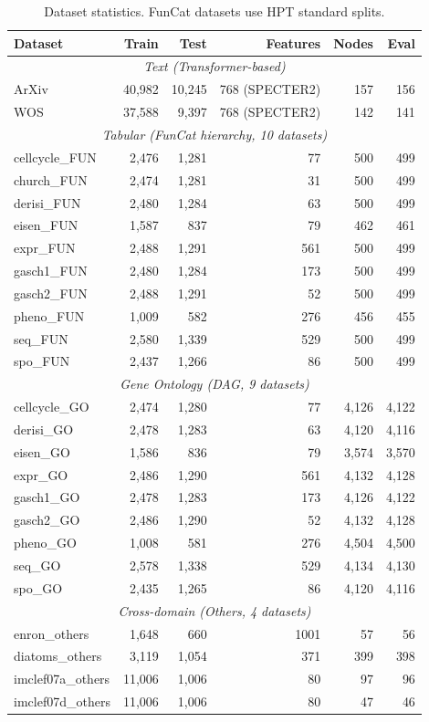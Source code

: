 \documentclass[11pt,a4paper]{article}
\begin{document}
\begin{table}[h]
\centering
\caption{Dataset statistics. FunCat datasets use HPT standard splits.}
\label{tab:datasets}
\begin{tabular}{lrrrrr}
\toprule
\textbf{Dataset} & \textbf{Train} & \textbf{Test} & \textbf{Features} &
\textbf{Nodes} & \textbf{Eval} \\
\midrule
\multicolumn{6}{c}{\textit{Text (Transformer-based)}} \\
ArXiv  & 40,982 & 10,245 & 768 (SPECTER2) & 157 & 156 \\
WOS    & 37,588 & 9,397  & 768 (SPECTER2) & 142 & 141 \\
\midrule
\multicolumn{6}{c}{\textit{Tabular (FunCat hierarchy, 10 datasets)}} \\
cellcycle\_FUN & 2,476 & 1,281 & 77  & 500 & 499 \\
church\_FUN    & 2,474 & 1,281 & 31  & 500 & 499 \\
derisi\_FUN    & 2,480 & 1,284 & 63  & 500 & 499 \\
eisen\_FUN     & 1,587 & 837   & 79  & 462 & 461 \\
expr\_FUN      & 2,488 & 1,291 & 561 & 500 & 499 \\
gasch1\_FUN    & 2,480 & 1,284 & 173 & 500 & 499 \\
gasch2\_FUN    & 2,488 & 1,291 & 52  & 500 & 499 \\
pheno\_FUN     & 1,009 & 582   & 276 & 456 & 455 \\
seq\_FUN       & 2,580 & 1,339 & 529 & 500 & 499 \\
spo\_FUN       & 2,437 & 1,266 & 86  & 500 & 499 \\
\midrule
\multicolumn{6}{c}{\textit{Gene Ontology (DAG, 9 datasets)}} \\
cellcycle\_GO & 2,474 & 1,280 & 77  & 4,126 & 4,122 \\
derisi\_GO    & 2,478 & 1,283 & 63  & 4,120 & 4,116 \\
eisen\_GO     & 1,586 & 836   & 79  & 3,574 & 3,570 \\
expr\_GO      & 2,486 & 1,290 & 561 & 4,132 & 4,128 \\
gasch1\_GO    & 2,478 & 1,283 & 173 & 4,126 & 4,122 \\
gasch2\_GO    & 2,486 & 1,290 & 52  & 4,132 & 4,128 \\
pheno\_GO     & 1,008 & 581   & 276 & 4,504 & 4,500 \\
seq\_GO       & 2,578 & 1,338 & 529 & 4,134 & 4,130 \\
spo\_GO       & 2,435 & 1,265 & 86  & 4,120 & 4,116 \\
\midrule
\multicolumn{6}{c}{\textit{Cross-domain (Others, 4 datasets)}} \\
enron\_others      & 1,648  & 660   & 1001 & 57   & 56 \\
diatoms\_others    & 3,119  & 1,054 & 371  & 399  & 398 \\
imclef07a\_others  & 11,006 & 1,006 & 80   & 97   & 96 \\
imclef07d\_others  & 11,006 & 1,006 & 80   & 47   & 46 \\
\bottomrule
\end{tabular}
\end{table}
\end{document}
